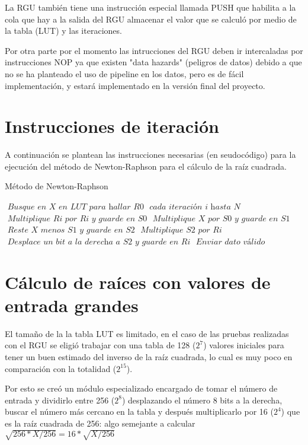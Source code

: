 La RGU también tiene una instrucción especial llamada PUSH que  habilita a la cola que hay a la salida del RGU almacenar el valor que se calculó por medio de la tabla (LUT) y las iteraciones.

Por otra parte por el momento las intrucciones del RGU deben ir intercaladas por instrucciones NOP ya que existen "data hazards" (peligros de datos) debido a que no se ha planteado el uso de pipeline en los datos, pero es de fácil implementación, y estará implementado en la versión final del proyecto.

\section{Instrucciones de iteración}

A continuación se plantean las instrucciones necesarias (en seudocódigo) para la ejecución del método de Newton-Raphson para el cálculo de la raíz cuadrada. 

\begin{algorithm}
\caption{Método de Newton-Raphson}\label{ray}
\begin{algorithmic}[1]
\State $\textit{ Busque en X en LUT para hallar R0}$
\For $\textit{ cada iteración i hasta N}$
\State $\textit{ Multiplique Ri por Ri y guarde en S0}$
\State $\textit{ Multiplique X por S0 y guarde en S1}$
\State $\textit{ Reste X menos S1 y guarde en S2}$
\State $\textit{ Multiplique S2 por Ri}$
\State $\textit{ Desplace un bit a la derecha a S2 y guarde en Ri}$
\EndFor
\State $\textit{ Enviar dato válido}$
\EndProcedure
\end{algorithmic}
\end{algorithm}

\section{Cálculo de raíces con valores de entrada grandes}


El tamaño de la la tabla LUT es limitado, en el caso de las pruebas realizadas con el RGU se eligió trabajar con una tabla de 128 ($2^7$) valores iniciales para tener un buen estimado del inverso de la raíz cuadrada, lo cual es muy poco en comparación con la totalidad ($2^{15}$).

Por esto se creó un módulo especializado encargado de tomar el número de entrada y dividirlo entre 256 ($2^8$) desplazando el número 8 bits a la derecha, buscar el número más cercano en la tabla y después multiplicarlo por 16 ($2^4$) que es la raíz cuadrada de 256: algo semejante a calcular $\sqrt{256*X/256}=16*\sqrt{X/256}$ 

